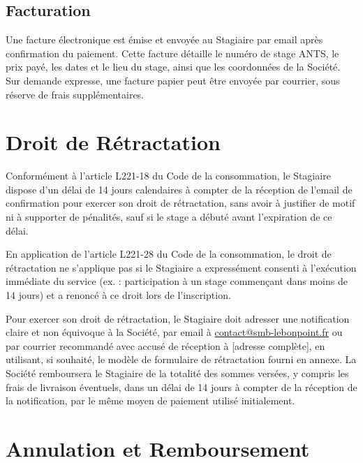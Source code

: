 \documentclass[a4paper,12pt]{article}
\begin{document}
\subsection{Facturation}
Une facture électronique est émise et envoyée au Stagiaire par email après confirmation du paiement. Cette facture détaille le numéro de stage ANTS, le prix payé, les dates et le lieu du stage, ainsi que les coordonnées de la Société. Sur demande expresse, une facture papier peut être envoyée par courrier, sous réserve de frais supplémentaires.

\section{Droit de Rétractation}
Conformément à l'article L221-18 du Code de la consommation, le Stagiaire dispose d'un délai de 14 jours calendaires à compter de la réception de l'email de confirmation pour exercer son droit de rétractation, sans avoir à justifier de motif ni à supporter de pénalités, sauf si le stage a débuté avant l'expiration de ce délai. 

En application de l'article L221-28 du Code de la consommation, le droit de rétractation ne s'applique pas si le Stagiaire a expressément consenti à l'exécution immédiate du service (ex. : participation à un stage commençant dans moins de 14 jours) et a renoncé à ce droit lors de l'inscription.

Pour exercer son droit de rétractation, le Stagiaire doit adresser une notification claire et non équivoque à la Société, par email à \href{mailto:contact@smb-lebonpoint.fr}{contact@smb-lebonpoint.fr} ou par courrier recommandé avec accusé de réception à [adresse complète], en utilisant, si souhaité, le modèle de formulaire de rétractation fourni en annexe. La Société remboursera le Stagiaire de la totalité des sommes versées, y compris les frais de livraison éventuels, dans un délai de 14 jours à compter de la réception de la notification, par le même moyen de paiement utilisé initialement.

\section{Annulation et Remboursement}
\end{document}
